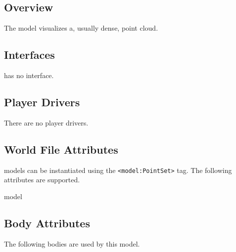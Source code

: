 \subsection{Overview}

The {\tt \modelName} model visualizes a, usually dense, point cloud.

\subsection{\libgazebo Interfaces}

{\tt \modelName} has no \libgazebo interface.

\subsection{Player Drivers}

There are no player drivers.

\subsection{World File Attributes}

{\tt \modelName} models can be instantiated using the
\verb+<model:PointSet>+ tag.  The following attributes are
supported.

\begin{xmlattrtable}{model}{\modelName}
\modeldefaults
{}
\end{xmlattrtable}


\subsection{Body Attributes}

The following bodies are used by this model.

\begin{bodyattrtable}
\bodydefaults
\end{bodyattrtable}

